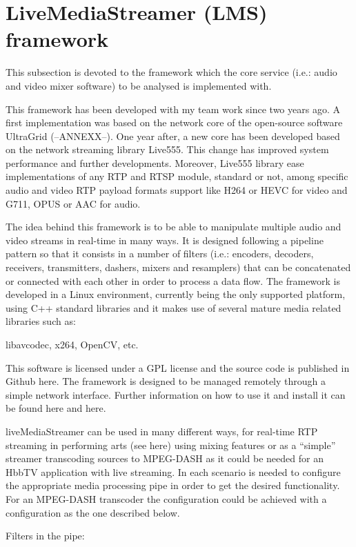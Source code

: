 \section{LiveMediaStreamer (LMS) framework}\label{SOA:LMS}

This subsection is devoted to the framework which the core service (i.e.: audio and video mixer software) to be analysed is implemented with. 

This framework has been developed with my team work since two years ago. A first implementation was based on the network core of the open-source software UltraGrid (--ANNEXX--). One year after, a new core has been developed based on the network streaming library Live555. This change has improved system performance and further developments. Moreover, Live555 library ease implementations of any RTP and RTSP module, standard or not, among specific audio and video RTP payload formats support like H264 or HEVC for video and G711, OPUS or AAC for audio.

The idea behind this framework is to be able to manipulate multiple audio and video streams in real-time in many ways. It is designed following a pipeline pattern so that it consists in a number of filters (i.e.: encoders, decoders, receivers, transmitters, dashers, mixers and resamplers) that can be concatenated or connected with each other in order to process a data flow. The framework is developed in a Linux environment, currently being the only supported platform, using C++ standard libraries and it makes use of several mature media related libraries such as:

 libavcodec, x264, OpenCV, etc. 
 
 This software is licensed under a GPL license and the source code is published in Github here. The framework is designed to be managed remotely through a simple network interface. Further information on how to use it and install it can be found here and here. 

liveMediaStreamer can be used in many different ways, for real-time RTP streaming in performing arts (see here) using mixing features or as a “simple” streamer transcoding sources to MPEG-DASH as it could be needed for an HbbTV application with live streaming. In each scenario is needed to configure the appropriate media processing pipe in order to get the desired functionality. For an MPEG-DASH transcoder the configuration could be achieved with a configuration as the one described below.

Filters in the pipe:

